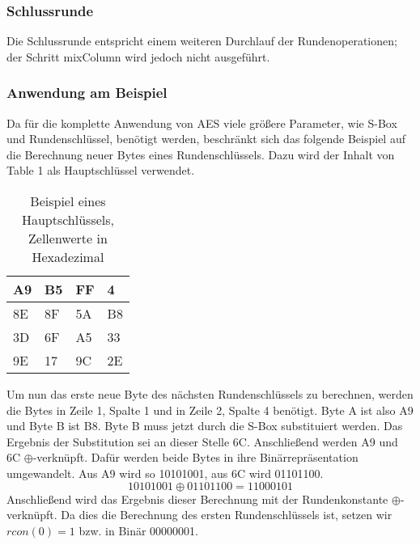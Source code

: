 \documentclass[conference,10pt,a4paper,twocolumn]{IEEEtran}
\begin{document}
\subsubsection{Schlussrunde}
Die Schlussrunde entspricht einem weiteren Durchlauf der Rundenoperationen; der Schritt mixColumn wird jedoch nicht ausgeführt.
\bigskip
\subsubsection{Anwendung am Beispiel}
Da für die komplette Anwendung von AES viele größere Parameter, wie S-Box und Rundenschlüssel, benötigt werden, beschränkt sich das folgende Beispiel auf die Berechnung neuer Bytes eines Rundenschlüssels. Dazu wird der Inhalt von Table 1 als Hauptschlüssel verwendet.
\begin{table}[h!]
\centering
\caption{Beispiel eines Hauptschlüssels, Zellenwerte in Hexadezimal}
\resizebox{8cm}{!} {
  \begin{tabular}{ | p{1cm} | p{1cm} | p{1cm} | p{1cm} |}
    \hline
    A9 & B5 & FF & 4 \\ \hline
    8E & 8F & 5A & B8 \\ \hline
    3D & 6F & A5 & 33 \\ \hline
    9E & 17 & 9C & 2E \\
    \hline
  \end{tabular}
}
\end{table}
\linebreak
Um nun das erste neue Byte des nächsten Rundenschlüssels zu berechnen, werden die Bytes in Zeile 1, Spalte 1 und in Zeile 2, Spalte 4 benötigt. Byte A ist also A9 und Byte B ist B8. Byte B muss jetzt durch die S-Box substituiert werden. Das Ergebnis der Substitution sei an dieser Stelle 6C. Anschließend werden A9 und 6C \begin{math}\oplus\end{math}-verknüpft. Dafür werden beide Bytes in ihre Binärrepräsentation umgewandelt. Aus A9 wird so 10101001, aus 6C wird 01101100.
\begin{equation}
10101001 \oplus 01101100 = 11000101
\end{equation}
Anschließend wird das Ergebnis dieser Berechnung mit der Rundenkonstante \begin{math}\oplus\end{math}-verknüpft. Da dies die Berechnung des ersten Rundenschlüssels ist, setzen wir \begin{math}rcon(0) = 1\end{math} bzw. in Binär 00000001.
\end{document}

